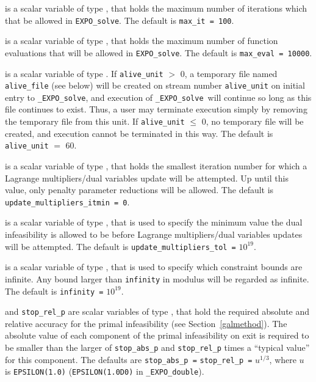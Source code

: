 \documentclass{galahad}
\newcommand{\packagename}{EXPO}
\newcommand{\fullpackagename}{\libraryname\_\packagename}
\newcommand{\solver}{{\tt \fullpackagename\_solve}}
\begin{document}
\begin{description}
 is a scalar variable of type \integer, that holds the
maximum number of iterations which that be allowed in {\tt \packagename\_solve}.
The default is {\tt max\_it = 100}.

 is a scalar variable of type \integer, that holds the
maximum number of function evaluations that will be allowed in 
{\tt \packagename\_solve}.
The default is {\tt max\_eval = 10000}.

 is a scalar variable of type \integer.
If {\tt alive\_unit} $>$ 0, a temporary file named {\tt alive\_file} (see below)
will be created on stream number {\tt alive\_unit} on initial entry to
\solver, and execution of \solver\ will continue so
long as this file continues to exist. Thus, a user may terminate execution
simply by removing the temporary file from this unit.
If {\tt alive\_unit} $\leq$ 0, no temporary file will be created, and
execution cannot be terminated in this way.
The default is {\tt alive\_unit} $=$ 60.

 is a scalar variable of type \integer, 
that holds the smallest iteration number for which a 
Lagrange multipliers/dual variables update will be attempted.
Up until this value, only penalty parameter reductions will be allowed.
The default is {\tt update\_multipliers\_itmin = 0}.

 is a scalar variable of type \realdp, that is 
used to specify the minimum value the dual infeasibility is allowed to be
before Lagrange multipliers/dual variables updates will be attempted.
The default is {\tt update\_multipliers\_tol =} $10^{19}$.

 is a scalar variable of type \realdp, that is used to
specify which constraint bounds are infinite.
Any bound larger than {\tt infinity} in modulus will be regarded as infinite.
The default is {\tt infinity =} $10^{19}$.

 and {\tt stop\_rel\_p}
are scalar variables of type \realdp, that hold the
required absolute and relative accuracy for the primal infeasibility
(see Section~\ref{galmethod}).
The absolute value of each component of the primal infeasibility
on exit is required to be smaller than the larger of {\tt stop\_abs\_p} and
{\tt stop\_rel\_p} times a ``typical value'' for this component.
The defaults are {\tt stop\_abs\_p =} {\tt stop\_rel\_p =} $u^{1/3}$,
where $u$ is {\tt EPSILON(1.0)} ({\tt EPSILON(1.0D0)} in
{\tt \fullpackagename\_double}).


\end{description}
\end{document}
